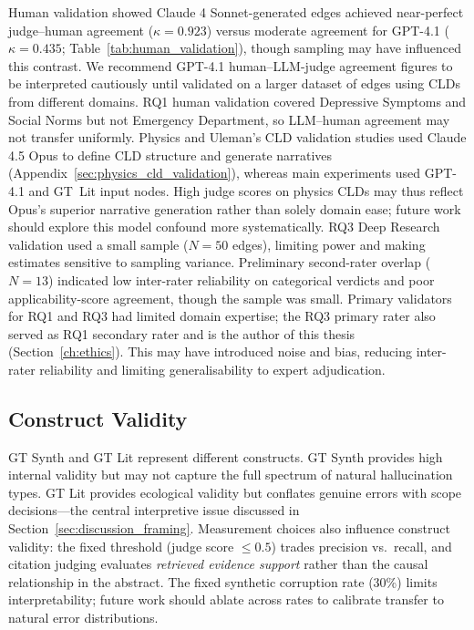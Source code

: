 Human validation showed Claude 4 Sonnet-generated edges achieved near-perfect judge--human agreement ($\kappa = 0.923$) versus moderate agreement for GPT-4.1 ($\kappa = 0.435$; Table~\ref{tab:human_validation}), though sampling may have influenced this contrast. We recommend GPT-4.1 human--LLM-judge agreement figures to be interpreted cautiously until validated on a larger dataset of edges using CLDs from different domains. RQ1 human validation covered Depressive Symptoms and Social Norms but not Emergency Department, so LLM--human agreement may not transfer uniformly. Physics and Uleman's CLD validation studies used Claude 4.5 Opus to define CLD structure and generate narratives (Appendix~\ref{sec:physics_cld_validation}), whereas main experiments used GPT-4.1 and GT~Lit input nodes. High judge scores on physics CLDs may thus reflect Opus's superior narrative generation rather than solely domain ease; future work should explore this model confound more systematically. RQ3 Deep Research validation used a small sample ($N=50$ edges), limiting power and making estimates sensitive to sampling variance. Preliminary second-rater overlap ($N=13$) indicated low inter-rater reliability on categorical verdicts and poor applicability-score agreement, though the sample was small. Primary validators for RQ1 and RQ3 had limited domain expertise; the RQ3 primary rater also served as RQ1 secondary rater and is the author of this thesis (Section~\ref{ch:ethics}). This may have introduced noise and bias, reducing inter-rater reliability and limiting generalisability to expert adjudication.

\subsection{Construct Validity}

GT Synth and GT Lit represent different constructs. GT Synth provides high internal validity but may not capture the full spectrum of natural hallucination types. GT Lit provides ecological validity but conflates genuine errors with scope decisions---the central interpretive issue discussed in Section~\ref{sec:discussion_framing}. Measurement choices also influence construct validity: the fixed threshold (judge score $\le 0.5$) trades precision vs.\ recall, and citation judging evaluates \emph{retrieved evidence support} rather than the causal relationship in the abstract. The fixed synthetic corruption rate (30\%) limits interpretability; future work should ablate across rates to calibrate transfer to natural error distributions.

